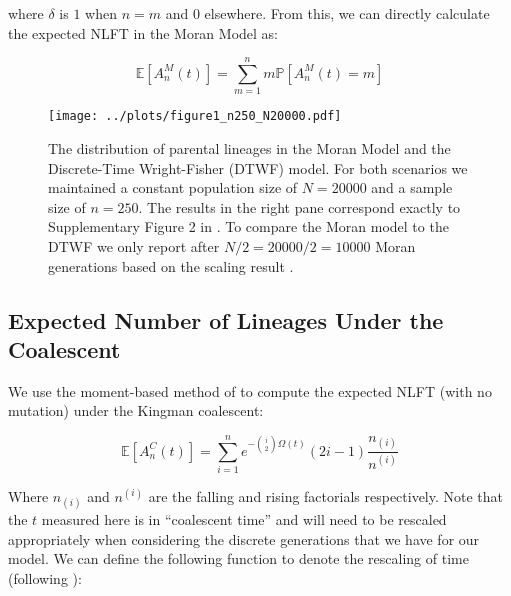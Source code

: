 \documentclass[11pt]{article}
\begin{document}
where $\delta$ is $1$ when $n = m$ and $0$ elsewhere. From this, we can directly calculate the expected NLFT in the Moran Model as:

 \begin{equation}
	 \mathbb{E}[A^M_n(t)] = \sum^n_{m=1} m \mathbb{P}[A^M_n (t) = m]
 \end{equation}

\begin{wrapfigure}{L}{0.5\textwidth}
	\begin{center}
	\texttt{[image: ../plots/figure1\_n250\_N20000.pdf]}
	\caption{The distribution of parental lineages in the Moran Model and the Discrete-Time Wright-Fisher (DTWF) model. For both scenarios we maintained a constant population size of $N = 20000$ and a sample size of $n=250$. The results in the right pane correspond exactly to Supplementary Figure 2 in \citet{Bhaskar2014}. To compare the Moran model to the DTWF we only report after $N/2 = 20000/2 = 10000$ Moran generations based on the scaling result \citep{Wakeley2008}.}
	\end{center}
\end{wrapfigure}


\subsection*{Expected Number of Lineages Under the Coalescent}

We use the moment-based method of \citet{Tavare1984} to compute the expected NLFT (with no mutation) under the Kingman coalescent:

\begin{equation}
	\mathbb{E}[A^C_n(t)] = \sum^n_{i=1} e^{-\binom{i}{2}\Omega(t)} (2i - 1) \frac{n_{(i)}}{n^{(i)}} 
\end{equation}


Where $n_{(i)}$ and $n^{(i)}$ are the falling and rising factorials respectively. Note that the $t$ measured here is in ``coalescent time'' and will need to be rescaled appropriately when considering the discrete generations that we have for our model. We can define the following function to denote the rescaling of time (following \citet{Bhaskar2014}):
\end{document}
